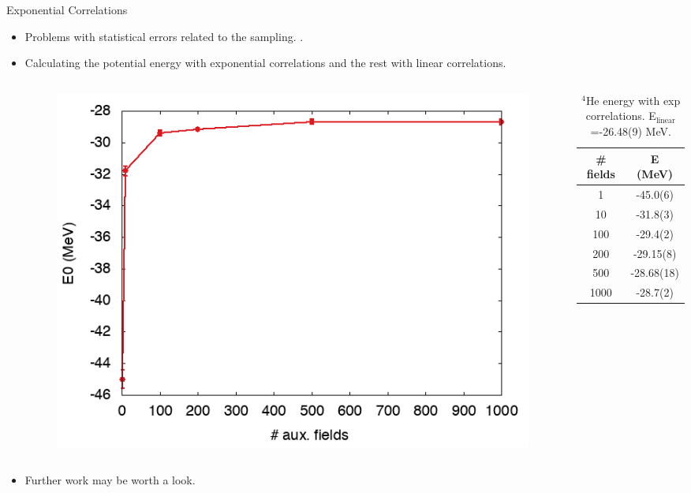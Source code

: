 \documentclass{beamer}
\newcommand{\red}[1]{{\color{red}{#1}}}
\begin{document}
\begin{frame}{Exponential Correlations}
\begin{itemize}
   \item Problems with statistical errors related to the sampling. \red{Understand where these errors are coming from}.
   \item Calculating the potential energy with exponential correlations and the rest with linear correlations.
   \begin{columns}
   \begin{column}{0.5\textwidth}
   \begin{figure}[h]
      \centering
      \includegraphics[width=\textwidth]{expplot.png}
   \end{figure}
   \end{column}
   \begin{column}{0.5\textwidth}
   \begin{table}[h!]
      \centering
      \caption{$^{4}$He energy with exp correlations. E$_\text{linear}$=-26.48(9) MeV.}
      \begin{tabular}{cc}
         \hline \hline
         \# fields & E (MeV) \\
         \hline
         1     & -45.0(6)  \\
         10    & -31.8(3)  \\
         100   & -29.4(2)  \\
         200   & -29.15(8) \\
         500   & -28.68(18)\\
         1000  & -28.7(2)  \\
         \hline \hline
      \end{tabular}
   \end{table}
   \end{column}
   \end{columns}
   \item Further work may be worth a look.
\end{itemize}
\end{frame}
\end{document}
